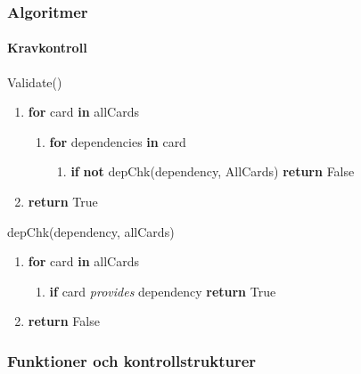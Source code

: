 \documentclass{beamer}
\begin{document}
\begin{frame}
    \frametitle{Algoritmer}
    \framesubtitle{Kravkontroll}
    
    Validate()
    \begin{enumerate}
        \item \textbf{for} card \textbf{in} allCards
        \begin{enumerate}
            \item \textbf{for} dependencies \textbf{in} card
            \begin{enumerate}
                \item \textbf{if} \textbf{not} depChk(dependency, AllCards) \textbf{return} False
            \end{enumerate}
        \end{enumerate}
        \item \textbf{return} True
    \end{enumerate}
    
    \vfill
    
    depChk(dependency, allCards)
    \begin{enumerate}
        \item \textbf{for} card \textbf{in} allCards
        \begin{enumerate}
            \item \textbf{if} card \emph{provides} dependency \textbf{return} True
        \end{enumerate}
        \item \textbf{return} False
    \end{enumerate}
\end{frame}

\begin{frame}
    \frametitle{Funktioner och kontrollstrukturer}
    
    
\end{frame}
\end{document}
